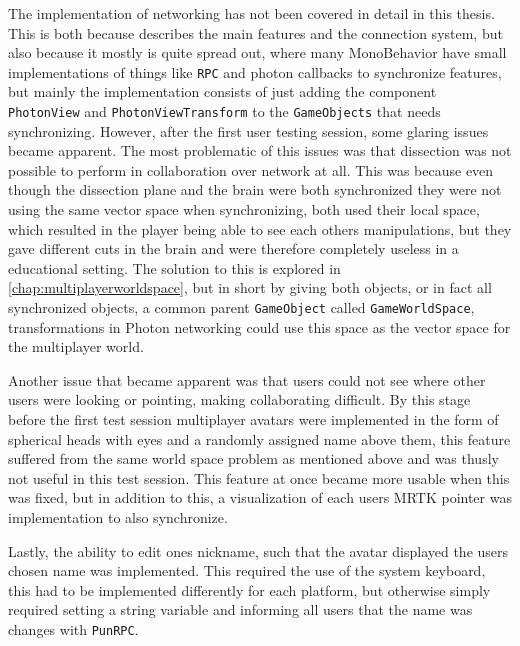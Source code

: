 The implementation of networking has not been covered in detail in this thesis. This is both because  describes the main features and the connection system, but also because it mostly is quite spread out, where many MonoBehavior have small implementations of things like \texttt{RPC} and photon callbacks to synchronize features, but mainly the implementation consists of just adding the component \texttt{PhotonView} and \texttt{PhotonViewTransform} to the \texttt{GameObjects} that needs synchronizing. 
However, after the first user testing session, some glaring issues became apparent. The most problematic of this issues was that dissection was not possible to perform in collaboration over network at all. This was because even though the dissection plane and the brain were both synchronized they were not using the same vector space when synchronizing, both used their local space, which resulted in the player being able to see each others manipulations, but they gave different cuts in the brain and were therefore completely useless in a educational setting. The solution to this is explored in \autoref{chap:multiplayerworldspace}, but in short by giving both objects, or in fact all synchronized objects, a common parent \texttt{GameObject} called \texttt{GameWorldSpace}, transformations in Photon networking could use this space as the vector space for the multiplayer world. 


Another issue that became apparent was that users could not see where other users were looking or pointing, making collaborating difficult. By this stage before the first test session multiplayer avatars were implemented in the form of spherical heads with eyes and a randomly assigned name above them, this feature suffered from the same world space problem as mentioned above and was thusly not useful in this test session. This feature at once became more usable when this was fixed, but in addition to this, a visualization of each users MRTK pointer was implementation to also synchronize. 

Lastly, the ability to edit ones nickname, such that the avatar displayed the users chosen name was implemented. This required the use of the system keyboard, this had to be implemented differently for each platform, but otherwise simply required setting a string variable and informing all users that the name was changes with \texttt{PunRPC}.

